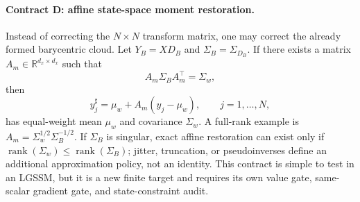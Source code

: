 \paragraph{Contract D: affine state-space moment restoration.}
Instead of correcting the \(N\times N\) transform matrix, one may correct the
already formed barycentric cloud.  Let \(Y_B=XD_B\) and
\(\Sigma_B=\Sigma_{D_B}\).  If there exists a matrix \(A_m\in\mathbb R^{d_x\times d_x}\)
such that
\begin{equation}
\label{eq:bf-eot-affine-moment-map}
  A_m\Sigma_B A_m^\top = \Sigma_w,
\end{equation}
then
\begin{equation}
\label{eq:bf-eot-affine-moment-output}
  y_j^\sharp
  =
  \mu_w + A_m(y_j-\mu_w),
  \qquad j=1,\ldots,N,
\end{equation}
has equal-weight mean \(\mu_w\) and covariance \(\Sigma_w\).  A full-rank example
is \(A_m=\Sigma_w^{1/2}\Sigma_B^{-1/2}\).  If \(\Sigma_B\) is singular, exact
affine restoration can exist only if
\(\operatorname{rank}(\Sigma_w)\le \operatorname{rank}(\Sigma_B)\);
jitter, truncation, or pseudoinverses define an additional approximation policy,
not an identity.  This contract is simple to test in an LGSSM, but it is a new
finite target and requires its own value gate, same-scalar gradient gate, and
state-constraint audit.

